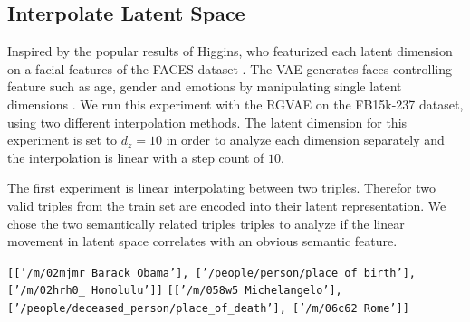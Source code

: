 \subsection{Interpolate Latent Space}

Inspired by the popular results of Higgins, who featurized each latent dimension on a facial features of the FACES dataset \cite{ebner_facesdatabase_2010}. The VAE generates faces controlling feature such as age, gender and emotions by manipulating single latent dimensions \cite{higgins_beta-vae_2016}.  We run this experiment with the RGVAE on the FB15k-237 dataset, using two different interpolation methods. The latent dimension for this experiment is set to $d_{z}=10$ in order to analyze each dimension separately and the interpolation is linear with a step count of $10$.

The first experiment is linear interpolating between two triples. Therefor two valid triples from the train set are encoded into their latent representation. We chose the two semantically related triples triples to analyze if the linear movement in latent space correlates with an obvious semantic feature. 

\begin{center}
  \texttt{[['/m/02mjmr Barack Obama'], ['/people/person/place\_of\_birth'], ['/m/02hrh0\_	Honolulu']]}
  \texttt{[['/m/058w5 Michelangelo'], ['/people/deceased\_person/place\_of\_death'], ['/m/06c62	Rome']]}
\end{center}



